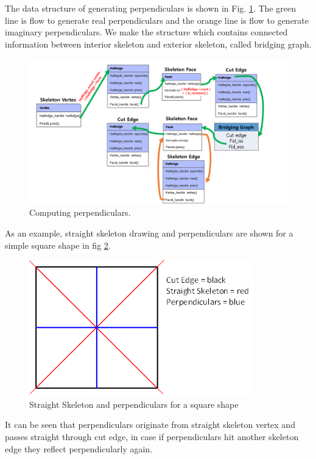 \documentclass[11pt]{article}
\begin{document}
The data structure of generating perpendiculars is shown in Fig. \ref{fig:ppdAlg}. The green line is flow to generate real perpendiculars and the orange line is flow to generate imaginary perpendiculars. We make the structure which contains connected information between interior skeleton and exterior skeleton, called bridging graph.
\begin{figure}[H]
\centering
\includegraphics[width=\textwidth]{FIGS/Part2/ppd}
\caption{Computing perpendiculars.}
\label{fig:ppdAlg}
\end{figure}

As an example, straight skeleton drawing and perpendiculars are shown for a simple square shape in fig \ref{fig:square}.
\begin{figure}[H]
\centering
\includegraphics[width=.4\textwidth]{FIGS/Part2/square}
\caption{Straight Skeleton and perpendiculars for a square shape}
\label{fig:square}
\end{figure}
 It can be seen that perpendiculars originate from straight skeleton vertex and passes straight through cut edge, in case if perpendiculars hit another skeleton edge they reflect perpendicularly again.
\end{document}
